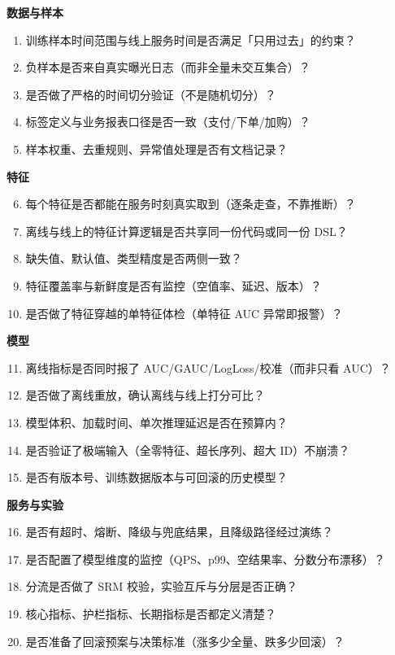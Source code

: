 \begin{toolbox}
\textbf{数据与样本}
\begin{enumerate}
  \item 训练样本时间范围与线上服务时间是否满足「只用过去」的约束？
  \item 负样本是否来自真实曝光日志（而非全量未交互集合）？
  \item 是否做了严格的时间切分验证（不是随机切分）？
  \item 标签定义与业务报表口径是否一致（支付/下单/加购）？
  \item 样本权重、去重规则、异常值处理是否有文档记录？
\end{enumerate}
\textbf{特征}
\begin{enumerate}
  \setcounter{enumi}{5}
  \item 每个特征是否都能在服务时刻真实取到（逐条走查，不靠推断）？
  \item 离线与线上的特征计算逻辑是否共享同一份代码或同一份 DSL？
  \item 缺失值、默认值、类型精度是否两侧一致？
  \item 特征覆盖率与新鲜度是否有监控（空值率、延迟、版本）？
  \item 是否做了特征穿越的单特征体检（单特征 AUC 异常即报警）？
\end{enumerate}
\textbf{模型}
\begin{enumerate}
  \setcounter{enumi}{10}
  \item 离线指标是否同时报了 AUC/GAUC/LogLoss/校准（而非只看 AUC）？
  \item 是否做了离线重放，确认离线与线上打分可比？
  \item 模型体积、加载时间、单次推理延迟是否在预算内？
  \item 是否验证了极端输入（全零特征、超长序列、超大 ID）不崩溃？
  \item 是否有版本号、训练数据版本与可回滚的历史模型？
\end{enumerate}
\textbf{服务与实验}
\begin{enumerate}
  \setcounter{enumi}{15}
  \item 是否有超时、熔断、降级与兜底结果，且降级路径经过演练？
  \item 是否配置了模型维度的监控（QPS、p99、空结果率、分数分布漂移）？
  \item 分流是否做了 SRM 校验，实验互斥与分层是否正确？
  \item 核心指标、护栏指标、长期指标是否都定义清楚？
  \item 是否准备了回滚预案与决策标准（涨多少全量、跌多少回滚）？
\end{enumerate}
\end{toolbox}

